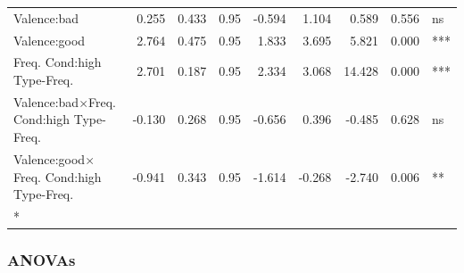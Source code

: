 \documentclass[
]{article}
\begin{document}
\begin{longtable}[t]{lrrrrrrrl}
\hspace{1em}Valence:bad & 0.255 & 0.433 & 0.95 & -0.594 & 1.104 & 0.589 & 0.556 & ns\\
\hspace{1em}Valence:good & 2.764 & 0.475 & 0.95 & 1.833 & 3.695 & 5.821 & 0.000 & ***\\
Freq.
Cond:high
\hspace{1em}Type-Freq. & 2.701 & 0.187 & 0.95 & 2.334 & 3.068 & 14.428 & 0.000 & ***\\
Valence:bad$\times$Freq.
Cond:high
\hspace{1em}Type-Freq. & -0.130 & 0.268 & 0.95 & -0.656 & 0.396 & -0.485 & 0.628 & ns\\
Valence:good$\times$Freq.
Cond:high
\hspace{1em}Type-Freq. & -0.941 & 0.343 & 0.95 & -1.614 & -0.268 & -2.740 & 0.006 & **\\*
\end{longtable}

\subsubsection{ANOVAs}\label{anovas-3}
\end{document}
